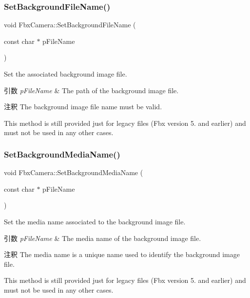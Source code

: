 \subsubsection{\texorpdfstring{Set\+Background\+File\+Name()}{SetBackgroundFileName()}}
{\footnotesize\ttfamily void Fbx\+Camera\+::\+Set\+Background\+File\+Name (\begin{DoxyParamCaption}\item[{const char $\ast$}]{p\+File\+Name }\end{DoxyParamCaption})}

Set the associated background image file. 
\begin{DoxyParams}{引数}
{\em p\+File\+Name} & The path of the background image file. \\
\hline
\end{DoxyParams}
\begin{DoxyRemark}{注釈}
The background image file name must be valid. 

This method is still provided just for legacy files (Fbx version 5. and earlier) and must not be used in any other cases. 
\end{DoxyRemark}
\mbox{\label{class_fbx_camera_a77dfe355ba878b5598ebcce811111585}} 
\subsubsection{\texorpdfstring{Set\+Background\+Media\+Name()}{SetBackgroundMediaName()}}
{\footnotesize\ttfamily void Fbx\+Camera\+::\+Set\+Background\+Media\+Name (\begin{DoxyParamCaption}\item[{const char $\ast$}]{p\+File\+Name }\end{DoxyParamCaption})}

Set the media name associated to the background image file. 
\begin{DoxyParams}{引数}
{\em p\+File\+Name} & The media name of the background image file. \\
\hline
\end{DoxyParams}
\begin{DoxyRemark}{注釈}
The media name is a unique name used to identify the background image file. 

This method is still provided just for legacy files (Fbx version 5. and earlier) and must not be used in any other cases. 
\end{DoxyRemark}
\mbox{\label{class_fbx_camera_a47cacdb816666eebadb56febbc3fa406}} 
